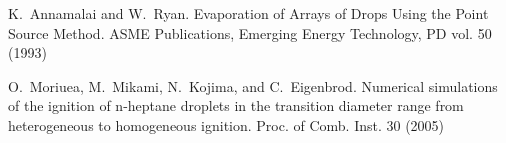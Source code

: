 
\begin{thebibliography}{10}
{\sc K.~Annamalai and W.~Ryan}. {Evaporation of Arrays of Drops Using the Point Source Method}. ASME Publications, Emerging Energy Technology, PD vol. 50 (1993)

{\sc O.~Moriuea, M.~Mikami, N.~Kojima, and C.~Eigenbrod}. {Numerical simulations of the ignition of n-heptane droplets in the transition diameter range from heterogeneous to homogeneous ignition}. Proc. of Comb. Inst. 30 (2005)
\end{thebibliography}